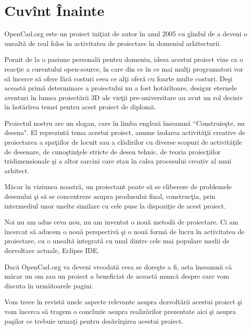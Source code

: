 \chapter{Cuvînt Înainte}

OpenCad.org este un proiect iniţiat de autor în anul 2005 cu gîndul de a deveni 
o unealtă de real folos în activitatea de proiectare în domeniul arhitecturii.

Pornit de la o pasiune personală pentru domeniu, ideea acestui proiect vine ca 
o reacţie a curentului open-source, în care din ce în ce mai mulţi programatori 
vor să încerce să ofere fără costuri ceea ce alţi oferă cu foarte multe 
costuri. Deşi această primă determinare a proiectului nu a fost hotărîtoare, 
desigur eternele aventuri în lumea proiectării 3D ale vieţii pre-universitare 
au avut un rol decisiv în hotărîrea temei pentru acest proiect de diplomă.

Proiectul nostru are un slogan, care în limba engleză înseamnă ``Construieşte,
nu desena". El reprezintă tema acestui proiect, anume izolarea activităţii
creative de proiectarea a spaţiilor de locuit sau a clădirilor cu diverse
scopuri de activităţile de desenare, de cunoştinţele stricte de desen tehnic, de
teoria proiecţiilor tridimensionale şi a altor sarcini care stau în calea
procesului creativ al unui arhitect.

Măcar în viziunea noastră, un proiectant poate să se elibereze de problemele
desenului şi să se concentreze asupra produsului final, construcţia, prin
intermediul unor unelte similare cu cele puse la dispoziţie de acest proiect.

Noi nu am adus ceva nou, nu am inventat o nouă metodă de proiectare. Ci am
încercat să aducem o nouă perspectivă şi o nouă formă de lucru în activitatea de
proiectare, cu o unealtă integrată cu unul dintre cele mai populare medii de
dezvoltare actuale, Eclipse IDE.

Dacă OpenCad.org va deveni vreodată ceea se doreşte a fi, asta înseamnă că măcar
un om sau un proiect a beneficiat de această muncă despre care vom discuta în
următoarele pagini.

Vom trece în revistă unele aspecte relevante asupra dezvoltării acestui proiect
şi vom încerca să tragem o concluzie asupra realizărilor prezentate aici şi
asupra paşilor ce trebuie urmaţi pentru desăvîrşirea acestui proiect.